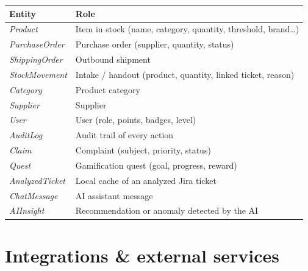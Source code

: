 \documentclass[11pt,a4paper]{article}
\begin{document}
\begin{center}
\begin{tabularx}{\linewidth}{@{}lX@{}}
\toprule
\textbf{Entity} & \textbf{Role}\\
\midrule
\textit{Product}          & Item in stock (name, category, quantity, threshold, brand\dots)\\
\textit{PurchaseOrder}    & Purchase order (supplier, quantity, status)\\
\textit{ShippingOrder}    & Outbound shipment \\
\textit{StockMovement}    & Intake / handout (product, quantity, linked ticket, reason)\\
\textit{Category}         & Product category \\
\textit{Supplier}         & Supplier \\
\textit{User}             & User (role, points, badges, level)\\
\textit{AuditLog}         & Audit trail of every action \\
\textit{Claim}            & Complaint (subject, priority, status)\\
\textit{Quest}            & Gamification quest (goal, progress, reward)\\
\textit{AnalyzedTicket}   & Local cache of an analyzed Jira ticket \\
\textit{ChatMessage}      & AI assistant message \\
\textit{AIInsight}        & Recommendation or anomaly detected by the AI \\
\bottomrule
\end{tabularx}
\end{center}

\section{Integrations \& external services}
\end{document}
